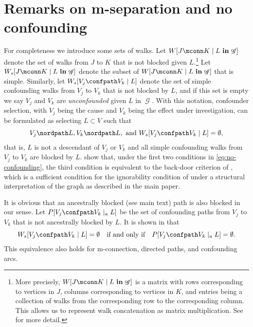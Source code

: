 \documentclass[12pt,a4paper]{article}
\theoremstyle{definition}
\newcommand{\ingraph}[1]{~\textnormal{\bf in}\,#1}
\newcommand{\textnot}{\textnormal{\bf not}~}
\DeclareMathOperator{\gG}{\mathscr{G}}
\begin{document}
\section{Remarks on m-separation and no confounding}
For completeness we introduce some sets of walks. Let $W[J \mconn K
\mid L \ingraph{\gG}]$ denote the set of walks from $J$ to $K$ that is
not blocked given $L$.\footnote{More precisely, $W[J \mconn K \mid L \ingraph{\gG}]$ is a matrix with rows corresponding to vertices in
$J$, columns corresponding to vertices in $K$, and entries being a collection of walks from the corresponding row to the corresponding
  column. This allows us to represent walk concatenation as matrix multiplication. See \textcite{zhao_matrix_2024} for more detail.} Let
$W_s[J \mconn K \mid L \ingraph{\gG}]$ denote the subset of $W[J
\mconn K \mid L \ingraph{\gG}]$ that is simple. Similarly, let
$W_s[V_j \confpath V_k \mid L]$ denote the set of simple confounding
walks from $V_j$ to $V_k$ that is not blocked by $L$, and if this set
is empty we say $V_j$ and $V_k$ are \emph{unconfounded} given $L$ in
$\gG$. %
With this notation, confounder selection, with $V_j$ being the cause and $V_k$ being the effect under investigation, can be formulated as selecting $L \subset V$ such that
\begin{equation} \label{eq:no-confounding}
  V_j \nordpath L, V_k \nordpath L,~\text{and}~ W_s[V_j \confpath V_k
  \mid L] = \emptyset,
\end{equation}
that is, $L$ is not a descendant of $V_j$ or $V_k$ and all simple
confounding walks from $V_j$ to $V_k$ are blocked by $L$. \textcite{guo_confounder_2023} show that, under the first two conditions in \eqref{eq:no-confounding}, the third condition is
equivalent to the back-door criterion of \textcite{pearl_causal_1995},
which is a sufficient condition for the ignorability condition of
\textcite{rosenbaum83_centr_role_propen_score_obser} under a structural
interpretation of the graph as described in the main paper.

It is obvious that an ancestrally blocked (see main text) path is also blocked in our sense. Let $P[V_j \confpath V_k \mid_a L]$ be the set of confounding paths from $V_j$ to $V_k$ that is not ancestrally blocked by $L$. It is shown in \textcite[Lemma 2]{guo_confounder_2023} that
\[
  W_s[V_j \confpath V_k \mid L] = \emptyset\quad\text{if and only if}\quad P[V_j \confpath V_k \mid_a L] = \emptyset.
\]
This equivalence also holds for m-connection, directed paths, and confounding arcs.
\end{document}

